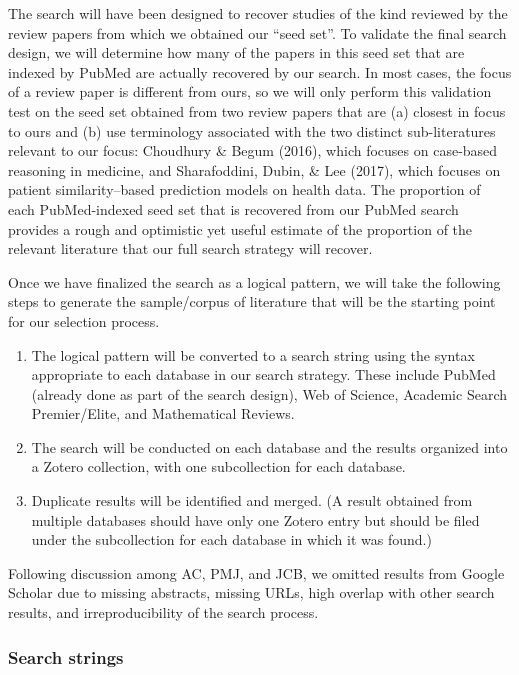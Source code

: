 \documentclass[preprint, 3p,
authoryear]{elsarticle} %
\providecommand{\tightlist}{%
  \setlength{\itemsep}{0pt}\setlength{\parskip}{0pt}}
\begin{document}
The search will have been designed to recover studies of the kind
reviewed by the review papers from which we obtained our ``seed set''.
To validate the final search design, we will determine how many of the
papers in this seed set that are indexed by PubMed are actually
recovered by our search. In most cases, the focus of a review paper is
different from ours, so we will only perform this validation test on the
seed set obtained from two review papers that are (a) closest in focus
to ours and (b) use terminology associated with the two distinct
sub-literatures relevant to our focus: Choudhury \& Begum (2016), which
focuses on case-based reasoning in medicine, and Sharafoddini, Dubin, \&
Lee (2017), which focuses on patient similarity--based prediction models
on health data. The proportion of each PubMed-indexed seed set that is
recovered from our PubMed search provides a rough and optimistic yet
useful estimate of the proportion of the relevant literature that our
full search strategy will recover.

Once we have finalized the search as a logical pattern, we will take the
following steps to generate the sample/corpus of literature that will be
the starting point for our selection process.

\begin{enumerate}
\def\labelenumi{\arabic{enumi}.}
\tightlist
\item
  The logical pattern will be converted to a search string using the
  syntax appropriate to each database in our search strategy. These
  include PubMed (already done as part of the search design), Web of
  Science, Academic Search Premier/Elite, and Mathematical Reviews.
\item
  The search will be conducted on each database and the results
  organized into a Zotero collection, with one subcollection for each
  database.
\item
  Duplicate results will be identified and merged. (A result obtained
  from multiple databases should have only one Zotero entry but should
  be filed under the subcollection for each database in which it was
  found.)
\end{enumerate}

Following discussion among AC, PMJ, and JCB, we omitted results from
Google Scholar due to missing abstracts, missing URLs, high overlap with
other search results, and irreproducibility of the search process.

\hypertarget{search-strings}{%
\subsubsection{Search strings}\label{search-strings}}
\end{document}

